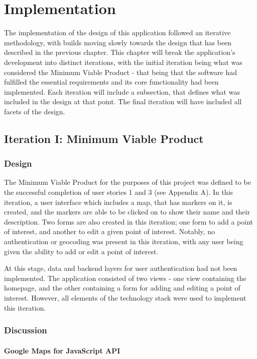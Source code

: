 \chapter{Implementation}

The implementation of the design of this application followed an iterative methodology, with builds moving slowly towards the design that has been described in the previous chapter. This chapter will break the application's development into distinct iterations, with the initial iteration being what was considered the Minimum Viable Product - that being that the software had fulfilled the essential requirements and its core functionality had been implemented. Each iteration will include a subsection, that defines what was included in the design at that point. The final iteration will have included all facets of the design.

\section{Iteration I: Minimum Viable Product}
\subsection{Design}
The Minimum Viable Product for the purposes of this project was defined to be the successful completion of user stories 1 and 3 (see Appendix A). In this iteration, a user interface which includes a map, that has markers on it, is created, and the markers are able to be clicked on to show their name and their description. Two forms are also created in this iteration; one form to add a point of interest, and another to edit a given point of interest. Notably, no authentication or geocoding was present in this iteration, with any user being given the ability to add or edit a point of interest.

At this stage, data and backend layers for user authentication had not been implemented. The application consisted of two views - one view containing the homepage, and the other containing a form for adding and editing a point of interest. However, all elements of the technology stack were used to implement this iteration.
\newpage

\subsection{Discussion}

\subsubsection{Google Maps for JavaScript API}

